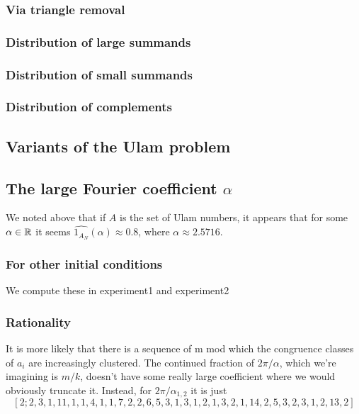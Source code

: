 \documentclass{article}
\theoremstyle{definition}
\theoremstyle{remark}
\numberwithin{equation}{section}
\begin{document}
{\subsubsection{Via triangle removal}
\subsubsection{Distribution of large summands}
\subsubsection{Distribution of small summands}
\subsubsection{Distribution of complements}

\subsection{Variants of the Ulam problem}









\subsection{The large Fourier coefficient $\alpha$}

We noted above that if $A$ is the set of Ulam numbers, it appears that
for some $\alpha \in \mathbb{R}$ it seems
$\widehat{1_{A_N}}(\alpha) \approx 0.8$, where
$\alpha \approx 2.5716$.

\subsubsection{For other initial conditions}

We compute these in experiment1 and experiment2



\subsubsection{Rationality}


It is more likely that there is a sequence of m mod which the
congruence classes of $a_i$ are increasingly clustered.  The continued
fraction of $2\pi/\alpha$, which we're imagining is $m/k$, doesn't have some
really large coefficient where we would obviously truncate it.
Instead, for $2\pi/\alpha_{1,2}$ it is just
\[[2; 2, 3, 1, 11, 1, 1, 4, 1, 1, 7, 2, 2, 6, 5, 3, 1, 3, 1, 2, 1, 3, 2, 1, 14, 2, 5, 3, 2, 3, 1, 2, 13, 2]\]

}
\end{document}
